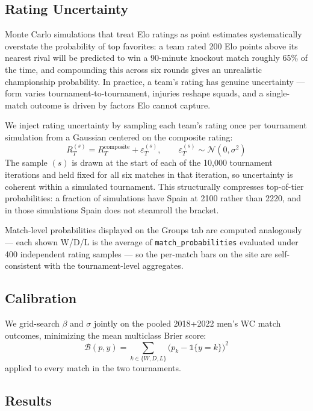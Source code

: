 \documentclass[11pt]{article}
\begin{document}
\subsection{Rating Uncertainty}
\label{sec:ratingsigma}

Monte Carlo simulations that treat Elo ratings as point estimates systematically overstate the probability of top favorites: a team rated 200 Elo points above its nearest rival will be predicted to win a 90-minute knockout match roughly 65\% of the time, and compounding this across six rounds gives an unrealistic championship probability. In practice, a team's rating has genuine uncertainty --- form varies tournament-to-tournament, injuries reshape squads, and a single-match outcome is driven by factors Elo cannot capture.

We inject rating uncertainty by sampling each team's rating once per tournament simulation from a Gaussian centered on the composite rating:
\begin{equation}
R_T^{(s)} = R_T^{\text{composite}} + \varepsilon_T^{(s)}, \qquad \varepsilon_T^{(s)} \sim \mathcal{N}(0, \sigma^2)
\label{eq:rating_sigma}
\end{equation}
The sample $(s)$ is drawn at the start of each of the 10{,}000 tournament iterations and held fixed for all six matches in that iteration, so uncertainty is coherent within a simulated tournament. This structurally compresses top-of-tier probabilities: a fraction of simulations have Spain at 2100 rather than 2220, and in those simulations Spain does not steamroll the bracket.

Match-level probabilities displayed on the Groups tab are computed analogously --- each shown W/D/L is the average of \texttt{match\_probabilities} evaluated under 400 independent rating samples --- so the per-match bars on the site are self-consistent with the tournament-level aggregates.

\subsection{Calibration}

We grid-search $\beta$ and $\sigma$ jointly on the pooled 2018+2022 men's WC match outcomes, minimizing the mean multiclass Brier score:
\[
\mathcal{B}(p, y) = \sum_{k \in \{W, D, L\}} \bigl(p_k - \mathbb{1}\{y = k\}\bigr)^2
\]
applied to every match in the two tournaments.

\subsection{Results}
\end{document}
